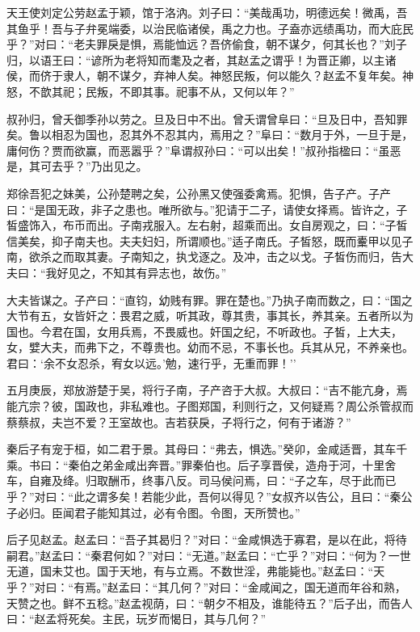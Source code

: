 \documentclass[]{article}
\begin{document}
天王使刘定公劳赵孟于颖，馆于洛汭。刘子曰：``美哉禹功，明德远矣！微禹，吾其鱼乎！吾与子弁冕端委，以治民临诸侯，禹之力也。子盍亦远绩禹功，而大庇民乎？''对曰：``老夫罪戾是惧，焉能恤远？吾侪偷食，朝不谋夕，何其长也？''刘子归，以语王曰：``谚所为老将知而耄及之者，其赵孟之谓乎！为晋正卿，以主诸侯，而侪于隶人，朝不谋夕，弃神人矣。神怒民叛，何以能久？赵孟不复年矣。神怒，不歆其祀；民叛，不即其事。祀事不从，又何以年？''

叔孙归，曾夭御季孙以劳之。旦及日中不出。曾夭谓曾阜曰：``旦及日中，吾知罪矣。鲁以相忍为国也，忍其外不忍其内，焉用之？''阜曰：``数月于外，一旦于是，庸何伤？贾而欲赢，而恶嚣乎？''阜谓叔孙曰：``可以出矣！''叔孙指楹曰：``虽恶是，其可去乎？''乃出见之。

郑徐吾犯之妹美，公孙楚聘之矣，公孙黑又使强委禽焉。犯惧，告子产。子产曰：``是国无政，非子之患也。唯所欲与。''犯请于二子，请使女择焉。皆许之，子皙盛饰入，布币而出。子南戎服入。左右射，超乘而出。女自房观之，曰：``子皙信美矣，抑子南夫也。夫夫妇妇，所谓顺也。''适子南氏。子皙怒，既而櫜甲以见子南，欲杀之而取其妻。子南知之，执戈逐之。及冲，击之以戈。子皙伤而归，告大夫曰：``我好见之，不知其有异志也，故伤。''

大夫皆谋之。子产曰：``直钧，幼贱有罪。罪在楚也。''乃执子南而数之，曰：``国之大节有五，女皆奸之：畏君之威，听其政，尊其贵，事其长，养其亲。五者所以为国也。今君在国，女用兵焉，不畏威也。奸国之纪，不听政也。子皙，上大夫，女，嬖大夫，而弗下之，不尊贵也。幼而不忌，不事长也。兵其从兄，不养亲也。君曰：`余不女忍杀，宥女以远。'勉，速行乎，无重而罪！''

五月庚辰，郑放游楚于吴，将行子南，子产咨于大叔。大叔曰：``吉不能亢身，焉能亢宗？彼，国政也，非私难也。子图郑国，利则行之，又何疑焉？周公杀管叔而蔡蔡叔，夫岂不爱？王室故也。吉若获戾，子将行之，何有于诸游？''

秦后子有宠于桓，如二君于景。其母曰：``弗去，惧选。''癸卯，金咸适晋，其车千乘。书曰：``秦伯之弟金咸出奔晋。''罪秦伯也。后子享晋侯，造舟于河，十里舍车，自雍及绛。归取酬币，终事八反。司马侯问焉，曰：``子之车，尽于此而已乎？''对曰：``此之谓多矣！若能少此，吾何以得见？''女叔齐以告公，且曰：``秦公子必归。臣闻君子能知其过，必有令图。令图，天所赞也。''

后子见赵孟。赵孟曰：``吾子其曷归？''对曰：``金咸惧选于寡君，是以在此，将待嗣君。''赵孟曰：``秦君何如？''对曰：``无道。''赵孟曰：``亡乎？''对曰：``何为？一世无道，国未艾也。国于天地，有与立焉。不数世淫，弗能毙也。''赵孟曰：``天乎？''对曰：``有焉。''赵孟曰：``其几何？''对曰：``金咸闻之，国无道而年谷和熟，天赞之也。鲜不五稔。''赵孟视荫，曰：``朝夕不相及，谁能待五？''后子出，而告人曰：``赵孟将死矣。主民，玩岁而愒日，其与几何？''
\end{document}
